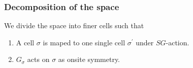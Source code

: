 \documentclass[xcolor=table, 10pt, aspectratio=43]{beamer}
\begin{document}
\begin{frame}
	\frametitle{Decomposition of the space}
	We divide the space into finer cells such that
	\begin{enumerate}
		\item A cell $\sigma$ is maped to one single cell $\sigma^\prime$ under $SG$-action.
		\item $G_\sigma$ acts on $\sigma$ as onsite symmetry.
	\end{enumerate}
	\begin{center}
	\end{center}
\end{frame}
\end{document}

